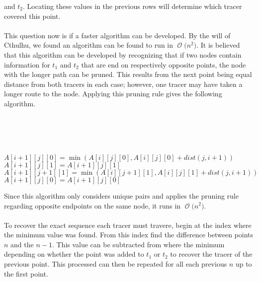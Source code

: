 \documentclass[12pt]{article}
\newcommand{\BigO}[1]{\ensuremath{\operatorname{\mathcal{O}}\bigl(#1\bigr)}}
\begin{document}
and $t_2$.  Locating these values in the previous rows will 
determine which tracer covered this point.\\\\
This question now is if a faster algorithm can be developed.
By the will of Cthulhu, we found an algorithm can be
found to run in \BigO{n^2}.
It is believed that this algorithm can be developed by recognizing that
if two nodes contain information for $t_1$ and $t_2$ that are
end on respectively opposite points, the node with the longer
path can be pruned.  This results from the next point being
equal distance from both tracers in each case; however,
one tracer may have taken a longer route to the node.  Applying
this pruning rule gives the following algorithm.\\\\
\begin{algorithm}[H]
\\
\\
\\
 {
     {
         {
            $A[i+1][j][0] = \min(A[i][j][0], A[i][j][0] + dist(j,i+1))$\\
            $A[i+1][j][1] = A[i+1][j][1]$\\
            $A[i+1][j+1][1] = \min(A[i][j+1][1], A[i][j][1] + dist(j,i+1))$\\
            $A[i+1][j][0] = A[i+1][j][0]$\\
        }
    }
}
\end{algorithm}
Since this algorithm only considers unique pairs and applies the pruning
rule regarding opposite endpoints on the same node, it runs in \BigO{n^2}.\\\\
To recover the exact sequence each tracer must travere, begin at the 
index where the minimum value was found. From this index find the difference
between points $n$ and the $n-1$.  This value can be subtracted from where the
minimum depending on whether the point was added to $t_1$ or $t_2$ to recover
the tracer of the previous point.  This processed can then be repeated for all
each previous $n$ up to the first point.
\end{document}
